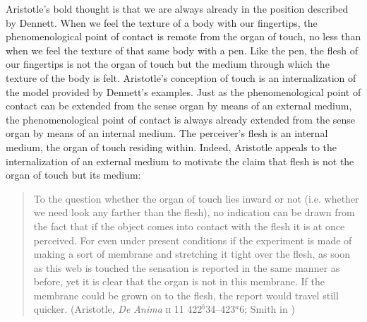 Aristotle's bold thought is that we are always already in the position described by Dennett. When we feel the texture of a body with our fingertips, the phenomenological point of contact is remote from the organ of touch, no less than when we feel the texture of that same body with a pen. Like the pen, the flesh of our fingertips is not the organ of touch but the medium through which the texture of the body is felt. Aristotle's conception of touch is an internalization of the model provided by Dennett's examples. Just as the phenomenological point of contact can be extended from the sense organ by means of an external medium, the phenomenological point of contact is always already extended from the sense organ by means of an internal medium. The perceiver's flesh is an internal medium, the organ of touch residing within. Indeed, Aristotle appeals to the internalization of an external medium to motivate the claim that flesh is not the organ of touch but its medium:
\begin{quote}
    To the question whether the organ of touch lies inward or not (i.e. whether we need look any farther than the flesh), no indication can be drawn from the fact that if the object comes into contact with the flesh it is at once perceived. For even under present conditions if the experiment is made of making a sort of membrane and stretching it tight over the flesh, as soon as this web is touched the sensation is reported in the same manner as before, yet it is clear that the organ is not in this membrane. If the membrane could be grown on to the flesh, the report would travel still quicker. (Aristotle, \emph{De Anima} \textsc{ii} 11 422\( ^{b} \)34--423\( ^{a} \)6; Smith in \citealt{Barnes:1984uq})
\end{quote}

